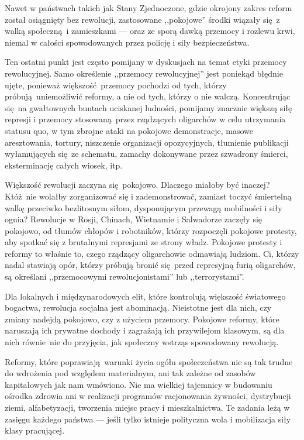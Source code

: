 \documentclass[12pt]{book}
\begin{document}
Nawet w państwach takich jak Stany Zjednoczone, gdzie okrojony zakres reform został osiągnięty bez rewolucji, zastosowane ,,pokojowe'' środki wiązały się z walką społeczną i zamieszkami — oraz ze sporą dawką przemocy i rozlewu krwi, niemal w całości spowodowanych przez policję i siły bezpieczeństwa.

Ten ostatni punkt jest często pomijany w dyskusjach na temat etyki przemocy rewolucyjnej. Samo określenie ,,przemocy rewolucyjnej'' jest poniekąd błędnie ujęte, ponieważ większość przemocy pochodzi od tych, którzy próbują uniemożliwić reformy, a nie od tych, którzy o nie walczą. Koncentrując się na gwałtownych buntach uciskanej ludności, pomijamy znacznie większą siłę represji i przemocy stosowaną przez rządzących oligarchów w celu utrzymania statusu quo, w tym zbrojne ataki na pokojowe demonstracje, masowe aresztowania, tortury, niszczenie organizacji opozycyjnych, tłumienie publikacji wyłamujących się ze schematu, zamachy dokonywane przez szwadrony śmierci, eksterminację całych wiosek, itp.

Większość rewolucji zaczyna się pokojowo. Dlaczego miałoby być inaczej? Któż nie wolałby zorganizować się i zademonstrować, zamiast toczyć śmiertelną walkę przeciwko bezlitosnym siłom, dysponującym przewagą mobilności i siły ognia? Rewolucje w Rosji, Chinach, Wietnamie i Salwadorze zaczęły się pokojowo, od tłumów chłopów i robotników, którzy rozpoczęli pokojowe protesty, aby spotkać się z brutalnymi represjami ze strony władz. Pokojowe protesty i reformy to właśnie to, czego rządzący oligarchowie odmawiają ludziom. Ci, którzy nadal stawiają opór, którzy próbują bronić się przed represyjną furią oligarchów, są określani ,,przemocowymi rewolucjonistami'' lub ,,terrorystami''.

Dla lokalnych i międzynarodowych elit, które kontrolują większość światowego bogactwa, rewolucja socjalna jest abominacją. Nieistotne jest dla nich, czy zmiany nadejdą pokojowo, czy z użyciem przemocy. Pokojowe reformy, które naruszają ich prywatne dochody i zagrażają ich przywilejom klasowym, są dla nich równie nie do przyjęcia, jak społeczny wstrząs spowodowany rewolucją.

Reformy, które poprawiają warunki życia ogółu społeczeństwa nie są tak trudne do wdrożenia pod względem materialnym, ani tak zależne od zasobów kapitałowych jak nam wmówiono. Nie ma wielkiej tajemnicy w budowaniu ośrodka zdrowia ani w realizacji programów racjonowania żywności, dystrybucji ziemi, alfabetyzacji, tworzenia miejsc pracy i mieszkalnictwa. Te zadania leżą w zasięgu każdego państwa — jeśli tylko istnieje polityczna wola i mobilizacja siły klasy pracującej.
\end{document}
